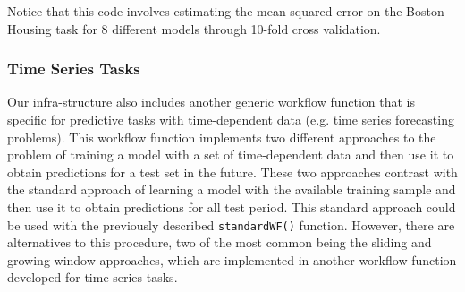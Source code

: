 \documentclass[10pt,a4paper]{article}\usepackage[]{graphicx}\usepackage[]{color}
\begin{document}
Notice that this code involves estimating the mean squared error on the Boston Housing task for 8 different models through
10-fold cross validation. 


\subsubsection{Time Series Tasks}

Our infra-structure also includes another generic workflow function
that is specific for predictive tasks with time-dependent data
(e.g. time series forecasting problems). This workflow function
implements two different approaches to the problem of training a
 model with a set of time-dependent data and then use it to
obtain predictions for a test set in the future. These two approaches
contrast with the standard approach of learning a model with the
available training sample and then use it to obtain predictions for
all test period. This standard approach could be used with the previously
described \texttt{standardWF()} function. However, there are
alternatives to this procedure, two of the most common being the
sliding and growing window approaches, which are implemented in another workflow function developed for time series tasks.
\end{document}
